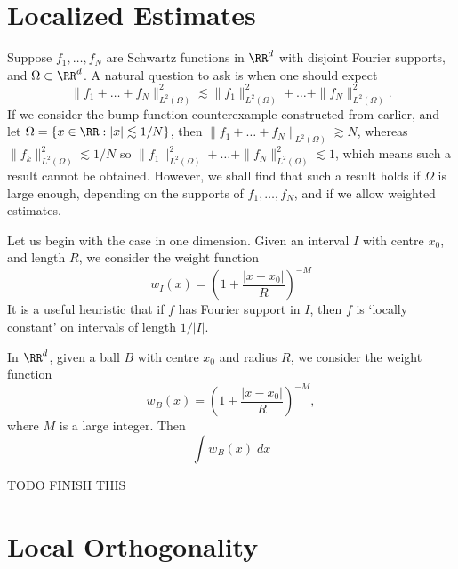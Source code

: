 \section{Localized Estimates}

Suppose $f_1, \dots, f_N$ are Schwartz functions in $\RR^d$ with disjoint Fourier supports, and $\Omega \subset \RR^d$. A natural question to ask is when one should expect
%
\[ \| f_1 + \dots + f_N \|_{L^2(\Omega)}^2 \lesssim \| f_1 \|_{L^2(\Omega)}^2 + \dots + \| f_N \|_{L^2(\Omega)}^2. \]
%
If we consider the bump function counterexample constructed from earlier, and let $\Omega = \{ x \in \RR: |x| \lesssim 1/N \}$, then $\| f_1 + \dots + f_N \|_{L^2(\Omega)} \gtrsim N$, whereas $\| f_k \|_{L^2(\Omega)}^2 \lesssim 1/N$ so $\| f_1 \|_{L^2(\Omega)}^2 + \dots + \| f_N \|_{L^2(\Omega)}^2 \lesssim 1$, which means such a result cannot be obtained. However, we shall find that such a result holds if $\Omega$ is large enough, depending on the supports of $f_1, \dots, f_N$, and if we allow weighted estimates.

Let us begin with the case in one dimension. Given an interval $I$ with centre $x_0$, and length $R$, we consider the weight function
%
\[ w_I(x) = \left( 1 + \frac{|x - x_0|}{R} \right)^{-M} \]
%
It is a useful heuristic that if $f$ has Fourier support in $I$, then $f$ is `locally constant' on intervals of length $1/|I|$.

In $\RR^d$, given a ball $B$ with centre $x_0$ and radius $R$, we consider the weight function
%
\[ w_B(x) = \left( 1 + \frac{|x - x_0|}{R} \right)^{-M}, \]
%
where $M$ is a large integer. Then
%
\[ \int w_B(x)\; dx \]

TODO FINISH THIS

\section{Local Orthogonality}

